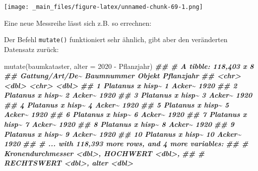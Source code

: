 \documentclass[
  ngerman,
]{article}
\newenvironment{Shaded}{\begin{snugshade}}{\end{snugshade}}
\newcommand{\AttributeTok}[1]{\textcolor[rgb]{0.77,0.63,0.00}{#1}}
\newcommand{\DecValTok}[1]{\textcolor[rgb]{0.00,0.00,0.81}{#1}}
\newcommand{\DocumentationTok}[1]{\textcolor[rgb]{0.56,0.35,0.01}{\textbf{\textit{#1}}}}
\newcommand{\FunctionTok}[1]{\textcolor[rgb]{0.00,0.00,0.00}{#1}}
\newcommand{\NormalTok}[1]{#1}
\newcommand{\OtherTok}[1]{\textcolor[rgb]{0.56,0.35,0.01}{#1}}
\newcommand{\SpecialCharTok}[1]{\textcolor[rgb]{0.00,0.00,0.00}{#1}}
\begin{document}
\texttt{[image: \_main\_files/figure-latex/unnamed-chunk-69-1.png]}

Eine neue Messreihe lässt sich z.B. so errechnen:

\begin{Shaded}
\end{Shaded}

Der Befehl \texttt{mutate()} funktioniert sehr ähnlich, gibt aber den veränderten Datensatz zurück:

\begin{Shaded}
\begin{Highlighting}[]
\FunctionTok{mutate}\NormalTok{(baumkataster, }\AttributeTok{alter =} \DecValTok{2020} \SpecialCharTok{{-}}\NormalTok{ Pflanzjahr)}
\DocumentationTok{\#\# \# A tibble: 118,403 x 8}
\DocumentationTok{\#\#    \textasciigrave{}Gattung/Art/De\textasciitilde{} Baumnummer Objekt Pflanzjahr}
\DocumentationTok{\#\#    \textless{}chr\textgreater{}                 \textless{}dbl\textgreater{} \textless{}chr\textgreater{}       \textless{}dbl\textgreater{}}
\DocumentationTok{\#\#  1 Platanus x hisp\textasciitilde{}          1 Acker\textasciitilde{}       1920}
\DocumentationTok{\#\#  2 Platanus x hisp\textasciitilde{}          2 Acker\textasciitilde{}       1920}
\DocumentationTok{\#\#  3 Platanus x hisp\textasciitilde{}          3 Acker\textasciitilde{}       1920}
\DocumentationTok{\#\#  4 Platanus x hisp\textasciitilde{}          4 Acker\textasciitilde{}       1920}
\DocumentationTok{\#\#  5 Platanus x hisp\textasciitilde{}          5 Acker\textasciitilde{}       1920}
\DocumentationTok{\#\#  6 Platanus x hisp\textasciitilde{}          6 Acker\textasciitilde{}       1920}
\DocumentationTok{\#\#  7 Platanus x hisp\textasciitilde{}          7 Acker\textasciitilde{}       1920}
\DocumentationTok{\#\#  8 Platanus x hisp\textasciitilde{}          8 Acker\textasciitilde{}       1920}
\DocumentationTok{\#\#  9 Platanus x hisp\textasciitilde{}          9 Acker\textasciitilde{}       1920}
\DocumentationTok{\#\# 10 Platanus x hisp\textasciitilde{}         10 Acker\textasciitilde{}       1920}
\DocumentationTok{\#\# \# ... with 118,393 more rows, and 4 more variables:}
\DocumentationTok{\#\# \#   Kronendurchmesser \textless{}dbl\textgreater{}, HOCHWERT \textless{}dbl\textgreater{},}
\DocumentationTok{\#\# \#   RECHTSWERT \textless{}dbl\textgreater{}, alter \textless{}dbl\textgreater{}}
\end{Highlighting}
\end{Shaded}
\end{document}
